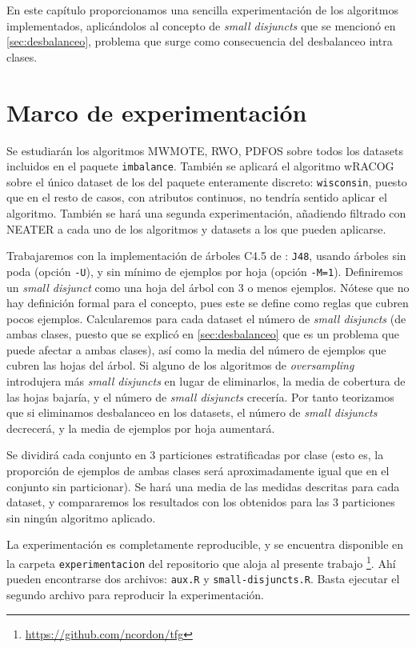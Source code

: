 \label{ch:sdisjuncts}
En este capítulo proporcionamos una sencilla experimentación de los algoritmos implementados, aplicándolos al concepto de 
\textit{small disjuncts} que se mencionó en \ref{sec:desbalanceo}, problema que surge como consecuencia del desbalanceo
intra clases.

\section{Marco de experimentación}
Se estudiarán los algoritmos MWMOTE, RWO, PDFOS sobre todos los datasets incluidos en el paquete \texttt{imbalance}. 
También se aplicará el algoritmo wRACOG sobre el único dataset de los del paquete enteramente discreto: \texttt{wisconsin},
puesto que en el resto de casos, con atributos continuos, no tendría sentido aplicar el algoritmo. También se hará una 
segunda experimentación, añadiendo filtrado con NEATER a cada uno de los algoritmos y datasets a los que pueden aplicarse.

Trabajaremos con la implementación de árboles C4.5 de : \texttt{J48}, usando árboles sin poda 
(opción \texttt{-U}), y sin mínimo de ejemplos por hoja (opción \texttt{-M=1}). 
Definiremos un \textit{small disjunct} como una hoja del árbol con 3 o menos ejemplos. Nótese 
que no hay definición formal para el concepto, pues este se define como reglas que cubren pocos ejemplos. Calcularemos para 
cada dataset el número de \textit{small disjuncts} (de ambas clases, puesto que se explicó en \ref{sec:desbalanceo} que 
es un problema que puede afectar a ambas clases), así como la media del número de ejemplos que cubren las hojas del árbol.
Si alguno de los algoritmos de \textit{oversampling} introdujera más \textit{small disjuncts} en lugar de eliminarlos, 
la media de cobertura de las hojas bajaría, y el número de \textit{small disjuncts} crecería. Por tanto teorizamos que si eliminamos 
desbalanceo en los datasets, el número de \textit{small disjuncts} decrecerá, y la media de ejemplos por hoja aumentará.

Se dividirá cada conjunto en 3 particiones estratificadas por clase (esto es, la proporción de ejemplos de ambas
clases será aproximadamente igual que en el conjunto sin particionar). Se hará una media de las medidas descritas para cada
dataset, y compararemos los resultados con los obtenidos para las 3 particiones sin ningún algoritmo aplicado.

La experimentación es completamente reproducible, y se encuentra disponible en la carpeta \texttt{experimentacion} del 
repositorio que aloja al presente trabajo \footnote{\url{https://github.com/ncordon/tfg}}.
Ahí pueden encontrarse dos archivos: \texttt{aux.R} y \texttt{small-disjuncts.R}. Basta ejecutar el segundo archivo
para reproducir la experimentación.

